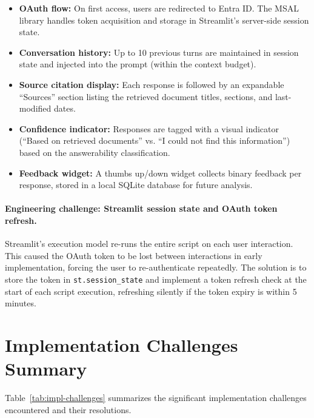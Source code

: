\begin{itemize}
  \item \textbf{OAuth flow:} On first access, users are redirected to Entra ID. The MSAL library handles token acquisition and storage in Streamlit's server-side session state.
  \item \textbf{Conversation history:} Up to 10 previous turns are maintained in session state and injected into the prompt (within the context budget).
  \item \textbf{Source citation display:} Each response is followed by an expandable ``Sources'' section listing the retrieved document titles, sections, and last-modified dates.
  \item \textbf{Confidence indicator:} Responses are tagged with a visual indicator (``Based on retrieved documents'' vs. ``I could not find this information'') based on the answerability classification.
  \item \textbf{Feedback widget:} A thumbs up/down widget collects binary feedback per response, stored in a local SQLite database for future analysis.
\end{itemize}

\paragraph{Engineering challenge: Streamlit session state and OAuth token refresh.} Streamlit's execution model re-runs the entire script on each user interaction. This caused the OAuth token to be lost between interactions in early implementation, forcing the user to re-authenticate repeatedly. The solution is to store the token in \texttt{st.session\_state} and implement a token refresh check at the start of each script execution, refreshing silently if the token expiry is within 5 minutes.

\section{Implementation Challenges Summary}
\label{sec:impl-challenges}

Table~\ref{tab:impl-challenges} summarizes the significant implementation challenges encountered and their resolutions.

